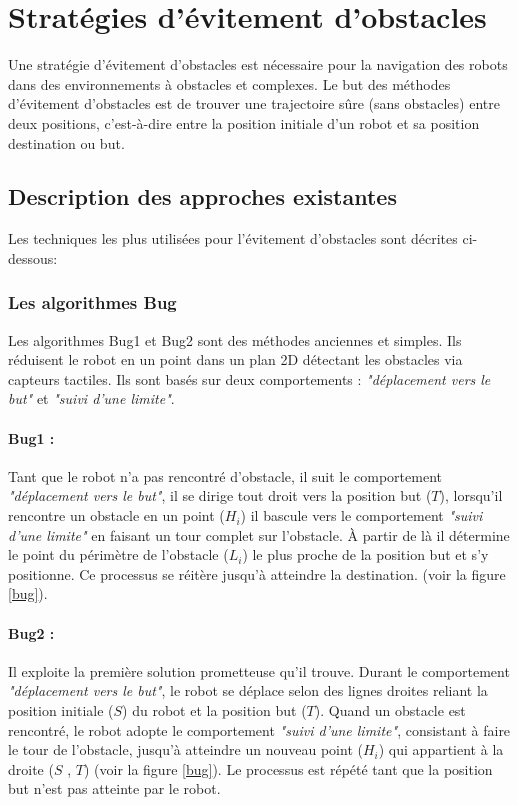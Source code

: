 \section{Stratégies d'évitement d'obstacles}
Une stratégie d'évitement d'obstacles est nécessaire pour la navigation des robots dans des environnements à obstacles et complexes.
Le but des méthodes d'évitement d'obstacles est de trouver une trajectoire sûre (sans obstacles) entre deux positions, c’est-à-dire entre la position initiale d’un robot et sa position destination ou but.


\subsection{Description des approches existantes}
Les techniques les plus utilisées pour l'évitement d'obstacles sont décrites ci-dessous:

\subsubsection{Les algorithmes Bug  \cite{Sara,Bug}}
Les algorithmes Bug1 et Bug2 sont des méthodes anciennes et simples. Ils réduisent le robot en un point dans un plan 2D détectant les obstacles via capteurs tactiles. Ils sont basés sur deux comportements : \textit{"déplacement vers le but"} et \textit{"suivi d’une limite"}. 

\paragraph{Bug1 :}Tant que le robot n’a pas rencontré d’obstacle, il suit le comportement \textit{"déplacement vers le but"}, il se dirige tout droit vers la position but ($T$), lorsqu’il rencontre un obstacle en un point ($H_{i}$) il bascule vers le comportement \textit{"suivi d’une limite"} en faisant un tour complet sur l’obstacle. À partir de là il détermine le point du périmètre de l’obstacle  ($L_{i}$) le plus proche de la position but et s’y positionne. Ce processus se réitère jusqu’à atteindre la destination. (voir la figure \ref{bug}).

\paragraph{Bug2 :}
 Il exploite la première solution prometteuse qu’il trouve. Durant le comportement \textit{"déplacement vers le but"}, le robot se déplace selon des lignes droites reliant la position initiale ($S$) du robot et la position but ($T$). Quand un obstacle est rencontré, le robot adopte le comportement \textit{"suivi d’une limite"}, consistant à faire le tour de l’obstacle, jusqu’à atteindre un nouveau point  ($H_{i}$) qui appartient à la droite ($S$ , $T$) (voir la figure \ref{bug}).
Le processus est répété tant que la position but n’est pas atteinte par le robot.

